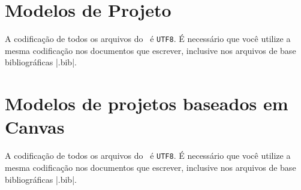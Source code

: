 \section{Modelos de Projeto}

A codificação de todos os arquivos do \abnTeX\ é \texttt{UTF8}. É necessário que
você utilize a mesma codificação nos documentos que escrever, inclusive nos
arquivos de base bibliográficas |.bib|.

\section{Modelos de projetos baseados em Canvas}

A codificação de todos os arquivos do \abnTeX\ é \texttt{UTF8}. É necessário que
você utilize a mesma codificação nos documentos que escrever, inclusive nos
arquivos de base bibliográficas |.bib|.







